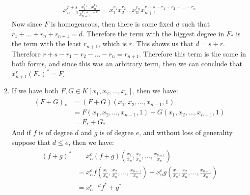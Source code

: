 \begin{enumerate}[label=\ilabel]
        \begin{gather*}
            x_{n + 1}^{r + s} \frac{x_1^{r_1} \dots x_n^{r_n}}{x_{n + 1}^{r_1 + \dots + r_n}} = x_1^{r_1} x_2^{r_2} \dots x_n^{r_n} x_{n + 1}^{r + s - r_1 - r_2 - \dots - r_n}
        \end{gather*}
        Now since $F$ is homogeneous, then there is some fixed $d$ such that $r_1 + \dots + r_n + r_{n + 1} = d$. Therefore the term with the biggest degree in $F_*$ is the term with the least $r_{n + 1}$, which is $r$. This shows us that $d = s + r$. Therefore $r + s - r_1 - r_2 - \dots - r_n = r_{n + 1}$. Therefore this term is the same in both forms, and since this was an arbitrary term, then we can conclude that $x_{n + 1}^{r} (F_*)^* = F$.
    \item 
        If we have both $F, G \in K[x_1, x_2, \dots, x_n]$, then we have:
        \begin{gather*}
            \begin{split}
                (F + G)_* & = (F + G)(x_1, x_2, \dots, x_{n - 1}, 1) \\
                & = F(x_1, x_2, \dots, x_{n - 1}, 1) + G(x_1, x_2, \dots, x_{n - 1}, 1)\\
                & = F_* + G_*
            \end{split}
        \end{gather*}
        And if $f$ is of degree $d$ and $g$ is of degree $e$, and without loss of generality suppose that $d \le e$, then we have:
        \begin{gather*}
            \begin{split}
                (f + g)^* & = x_n^e (f + g)(\frac{x_1}{x_n}, \frac{x_2}{x_n}, \dots, \frac{x_{n - 1}}{x_n}) \\
                & = x_n^e f(\frac{x_1}{x_n}, \frac{x_2}{x_n}, \dots, \frac{x_{n - 1}}{x_n}) + x_n^e g(\frac{x_1}{x_n}, \frac{x_2}{x_n}, \dots, \frac{x_{n - 1}}{x_n}) \\
                & = x_n^{e - d} f^* + g^*
            \end{split}
        \end{gather*}
\end{enumerate}